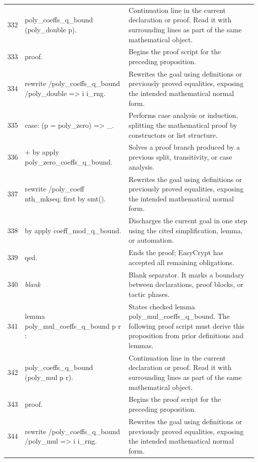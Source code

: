 \documentclass[10pt]{article}
\begin{document}
\begin{longtable}{r L{0.53\textwidth} L{0.37\textwidth}}
332 & {\ttfamily\scriptsize   poly\_coeffs\_q\_bound (poly\_double p).} & Continuation line in the current declaration or proof.  Read it with surrounding lines as part of the same mathematical object. \\
333 & {\ttfamily\scriptsize proof.} & Begins the proof script for the preceding proposition. \\
334 & {\ttfamily\scriptsize rewrite /poly\_coeffs\_q\_bound /poly\_double => i i\_rng.} & Rewrites the goal using definitions or previously proved equalities, exposing the intended mathematical normal form. \\
335 & {\ttfamily\scriptsize case: (p = poly\_zero) => \_.} & Performs case analysis or induction, splitting the mathematical proof by constructors or list structure. \\
336 & {\ttfamily\scriptsize + by apply poly\_zero\_coeffs\_q\_bound.} & Solves a proof branch produced by a previous split, transitivity, or case analysis. \\
337 & {\ttfamily\scriptsize rewrite /poly\_coeff nth\_mkseq; first by smt().} & Rewrites the goal using definitions or previously proved equalities, exposing the intended mathematical normal form. \\
338 & {\ttfamily\scriptsize by apply coeff\_mod\_q\_bound.} & Discharges the current goal in one step using the cited simplification, lemma, or automation. \\
339 & {\ttfamily\scriptsize qed.} & Ends the proof; EasyCrypt has accepted all remaining obligations. \\
340 & {\ttfamily\scriptsize \emph{blank}} & Blank separator.  It marks a boundary between declarations, proof blocks, or tactic phases. \\
341 & {\ttfamily\scriptsize lemma poly\_mul\_coeffs\_q\_bound p r :} & States checked lemma poly\_mul\_coeffs\_q\_bound.  The following proof script must derive this proposition from prior definitions and lemmas. \\
342 & {\ttfamily\scriptsize   poly\_coeffs\_q\_bound (poly\_mul p r).} & Continuation line in the current declaration or proof.  Read it with surrounding lines as part of the same mathematical object. \\
343 & {\ttfamily\scriptsize proof.} & Begins the proof script for the preceding proposition. \\
344 & {\ttfamily\scriptsize rewrite /poly\_coeffs\_q\_bound /poly\_mul => i i\_rng.} & Rewrites the goal using definitions or previously proved equalities, exposing the intended mathematical normal form. \\

\end{longtable}
\end{document}
